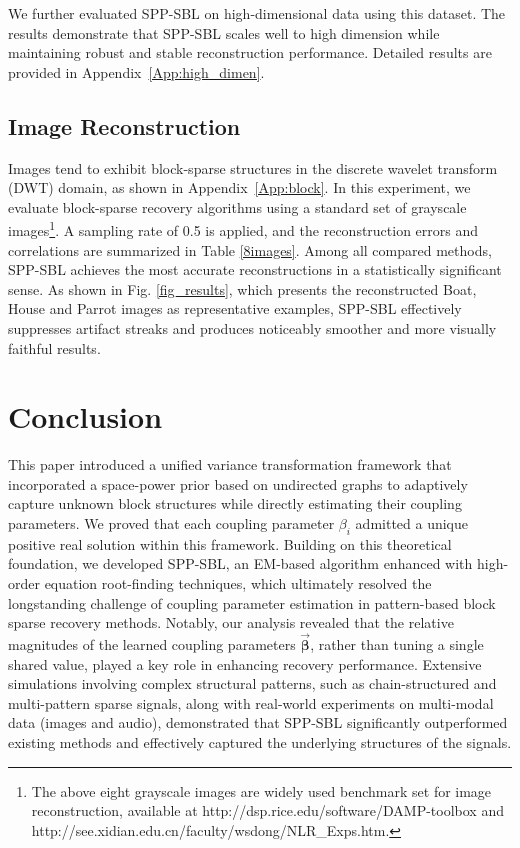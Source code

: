 \documentclass[lettersize,journal]{IEEEtran}
\theoremstyle{remark}
\begin{document}
We further evaluated SPP-SBL on high-dimensional data using this dataset. The results demonstrate that SPP-SBL scales well to high dimension while maintaining robust and stable reconstruction performance. Detailed results are provided in Appendix~\ref{App:high_dimen}.




\subsection{Image Reconstruction}\label{image}



Images tend to exhibit block-sparse structures in the discrete wavelet transform (DWT) domain, as shown in Appendix~\ref{App:block}.
In this experiment, we evaluate block-sparse recovery algorithms using a standard set of grayscale images\footnote{The above eight grayscale images are widely used benchmark set for image reconstruction, available at http://dsp.rice.edu/software/DAMP-toolbox and http://see.xidian.edu.cn/faculty/wsdong/NLR\_Exps.htm.}. A sampling rate of 0.5 is applied, and the reconstruction errors and correlations are summarized in Table \ref{8images}. Among all compared methods, SPP-SBL achieves the most accurate reconstructions in a statistically significant sense. As shown in Fig. \ref{fig_results}, which presents the reconstructed Boat, House and Parrot images as representative examples, SPP-SBL effectively suppresses artifact streaks and produces noticeably smoother and more visually faithful results.











\section{Conclusion} \label{conclusion}


This paper introduced a unified variance transformation framework that incorporated a space-power prior based on undirected graphs to adaptively capture unknown block structures while directly estimating their coupling parameters. We proved that each coupling parameter $\beta_i$ admitted a unique positive real solution within this framework. Building on this theoretical foundation, we developed SPP-SBL, an EM-based algorithm enhanced with high-order equation root-finding techniques, which ultimately resolved the longstanding challenge of coupling parameter estimation in pattern-based block sparse recovery methods. Notably, our analysis revealed that the relative magnitudes of the learned coupling parameters $\vec{\boldsymbol{\beta}}$, rather than tuning a single shared value, played a key role in enhancing recovery performance.
Extensive simulations involving complex structural patterns, such as chain-structured and multi-pattern sparse signals, along with real-world experiments on multi-modal data (images and audio), demonstrated that SPP-SBL significantly outperformed existing methods and effectively captured the underlying structures of the signals.
\end{document}
